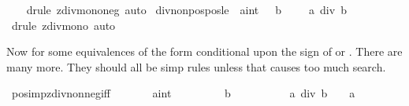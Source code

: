 \begin{isabellebody}
%
\isadelimproof
\ \ %
\endisadelimproof
%
\isatagproof
{}\isamarkupfalse%
\ {\isacharparenleft}{\kern0pt}drule\ zdiv{\isacharunderscore}{\kern0pt}mono{}{\isacharunderscore}{\kern0pt}neg{\isacharcomma}{\kern0pt}\ auto{\isacharparenright}{\kern0pt}%
\endisatagproof
{\isafoldproof}%
%
\isadelimproof
\isanewline
%
\endisadelimproof
\isanewline
{}\isamarkupfalse%
\ div{\isacharunderscore}{\kern0pt}nonpos{\isacharunderscore}{\kern0pt}pos{\isacharunderscore}{\kern0pt}le{}{\isacharcolon}{\kern0pt}\ {\isachardoublequoteopen}{\isacharbrackleft}{\kern0pt}{\isacharbar}{\kern0pt}\ {\isacharparenleft}{\kern0pt}a{\isacharcolon}{\kern0pt}{\isacharcolon}{\kern0pt}int{\isacharparenright}{\kern0pt}\ {\isasymle}\ {}{\isacharsemicolon}{\kern0pt}\ b\ {\isachargreater}{\kern0pt}\ {}\ {\isacharbar}{\kern0pt}{\isacharbrackright}{\kern0pt}\ {\isacharequal}{\kern0pt}{\isacharequal}{\kern0pt}{\isachargreater}{\kern0pt}\ a\ div\ b\ {\isasymle}\ {}{\isachardoublequoteclose}\isanewline
%
\isadelimproof
\ \ %
\endisadelimproof
%
\isatagproof
{}\isamarkupfalse%
\ {\isacharparenleft}{\kern0pt}drule\ zdiv{\isacharunderscore}{\kern0pt}mono{}{\isacharcomma}{\kern0pt}\ auto{\isacharparenright}{\kern0pt}%
\endisatagproof
{\isafoldproof}%
%
\isadelimproof
%
\endisadelimproof
%
\begin{isamarkuptext}%
Now for some equivalences of the form 
conditional upon the sign of  or . There are many more.
They should all be simp rules unless that causes too much search.%
\end{isamarkuptext}\isamarkuptrue%
\isamarkupfalse%
\ pos{\isacharunderscore}{\kern0pt}imp{\isacharunderscore}{\kern0pt}zdiv{\isacharunderscore}{\kern0pt}nonneg{\isacharunderscore}{\kern0pt}iff{\isacharcolon}{\kern0pt}\isanewline
\ \ \ \ \ \ \ a{\isacharcolon}{\kern0pt}{\isacharcolon}{\kern0pt}int\isanewline
\ \ \ \ \ \ \ {\isachardoublequoteopen}{}\ {\isacharless}{\kern0pt}\ b{\isachardoublequoteclose}\ \isanewline
\ \ \ \ \ \ \ {\isachardoublequoteopen}{\isacharparenleft}{\kern0pt}{}\ {\isasymle}\ a\ div\ b{\isacharparenright}{\kern0pt}\ {\isacharequal}{\kern0pt}\ {\isacharparenleft}{\kern0pt}{}\ {\isasymle}\ a{\isacharparenright}{\kern0pt}{\isachardoublequoteclose}\isanewline

\end{isabellebody}
